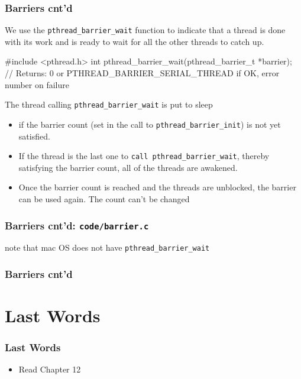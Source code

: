 \documentclass[newPxFont,sthlmFooter,nooffset]{beamer}
\begin{document}
\begin{frame}[t, fragile]
  \frametitle{Barriers cnt'd}
We use the \texttt{pthread\_barrier\_wait} function to indicate that a thread is done with its work and is ready to wait for all the other threads to catch up.
\begin{codedef}
#include <pthread.h>
int pthread_barrier_wait(pthread_barrier_t *barrier);
// Returns: 0 or PTHREAD_BARRIER_SERIAL_THREAD if OK, error number on failure
\end{codedef}
The thread calling \texttt{pthread\_barrier\_wait} is put to sleep
\begin{itemize}
\item if the barrier count (set in the call to \texttt{pthread\_barrier\_init})
  is not yet satisfied.
\item If the thread is the last one to \texttt{call pthread\_barrier\_wait}, thereby satisfying the barrier count, all of the threads are awakened.
\item Once the barrier count is reached and the threads are unblocked, the barrier can be used again. The count can't be changed
\end{itemize}

\end{frame}


\begin{frame}
  \frametitle{Barriers cnt'd: \texttt{code/barrier.c}}

note that mac OS does not have \texttt{pthread\_barrier\_wait}
  

\end{frame}


\begin{frame}[t]
  \frametitle{Barriers cnt'd}

\end{frame}






\section{Last Words}

\begin{frame}[t]
  \frametitle{Last Words}

\begin{itemize}
\item Read Chapter 12
\end{itemize}
\end{frame}
\end{document}
